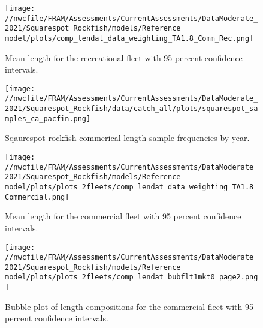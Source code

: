 \documentclass[11pt,
  english,
  a4paper,
]{article}
\begin{document}
\tagmcend\tagstructend


\begin{figure}
\centering
\texttt{[image: //nwcfile/FRAM/Assessments/CurrentAssessments/DataModerate\_2021/Squarespot\_Rockfish/models/Reference model/plots/comp\_lendat\_data\_weighting\_TA1.8\_Comm\_Rec.png]}
\caption{Mean length for the recreational fleet with 95 percent confidence intervals.\label{fig:rec-mean-len-data}}
\end{figure}

\tagmcend\tagstructend


\begin{figure}
\centering
\texttt{[image: //nwcfile/FRAM/Assessments/CurrentAssessments/DataModerate\_2021/Squarespot\_Rockfish/data/catch\_all/plots/squarespot\_samples\_ca\_pacfin.png]}
\caption{Sqaurespot rockfish commerical length sample frequencies by year.\label{fig:squarespot_samples_ca_pacfin}}
\end{figure}

\tagmcend\tagstructend


\begin{figure}
\centering
\texttt{[image: //nwcfile/FRAM/Assessments/CurrentAssessments/DataModerate\_2021/Squarespot\_Rockfish/models/Reference model/plots/plots\_2fleets/comp\_lendat\_data\_weighting\_TA1.8\_Commercial.png]}
\caption{Mean length for the commercial fleet with 95 percent confidence intervals.\label{fig:comm-mean-len-data}}
\end{figure}

\tagmcend\tagstructend


\begin{figure}
\centering
\texttt{[image: //nwcfile/FRAM/Assessments/CurrentAssessments/DataModerate\_2021/Squarespot\_Rockfish/models/Reference model/plots/plots\_2fleets/comp\_lendat\_bubflt1mkt0\_page2.png]}
\caption{Bubble plot of length compositions for the commercial fleet with 95 percent confidence intervals.\label{fig:bubble-comm-len-data}}
\end{figure}
\end{document}
